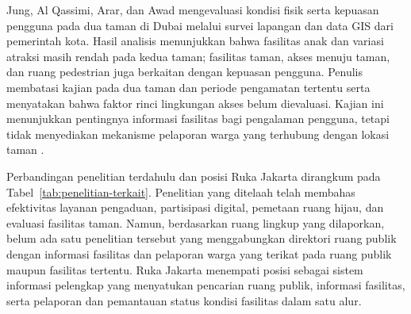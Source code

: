 \documentclass[conference]{IEEEtran}
\begin{document}
Jung, Al Qassimi, Arar, dan Awad mengevaluasi kondisi fisik serta kepuasan pengguna pada dua taman di Dubai melalui survei lapangan dan data GIS dari pemerintah kota. Hasil analisis menunjukkan bahwa fasilitas anak dan variasi atraksi masih rendah pada kedua taman; fasilitas taman, akses menuju taman, dan ruang pedestrian juga berkaitan dengan kepuasan pengguna. Penulis membatasi kajian pada dua taman dan periode pengamatan tertentu serta menyatakan bahwa faktor rinci lingkungan akses belum dievaluasi. Kajian ini menunjukkan pentingnya informasi fasilitas bagi pengalaman pengguna, tetapi tidak menyediakan mekanisme pelaporan warga yang terhubung dengan lokasi taman \cite{jung2022}.

Perbandingan penelitian terdahulu dan posisi Ruka Jakarta dirangkum pada Tabel~\ref{tab:penelitian-terkait}. Penelitian yang ditelaah telah membahas efektivitas layanan pengaduan, partisipasi digital, pemetaan ruang hijau, dan evaluasi fasilitas taman. Namun, berdasarkan ruang lingkup yang dilaporkan, belum ada satu penelitian tersebut yang menggabungkan direktori ruang publik dengan informasi fasilitas dan pelaporan warga yang terikat pada ruang publik maupun fasilitas tertentu. Ruka Jakarta menempati posisi sebagai sistem informasi pelengkap yang menyatukan pencarian ruang publik, informasi fasilitas, serta pelaporan dan pemantauan status kondisi fasilitas dalam satu alur.
\end{document}
